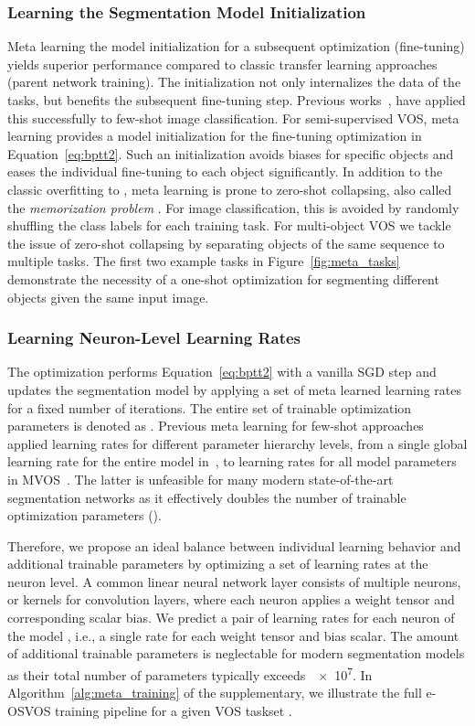 \documentclass{article}
\begin{document}
    \subsubsection{Learning the Segmentation Model Initialization}
Meta learning the model initialization for a subsequent optimization (fine-tuning) yields superior performance compared to classic transfer learning approaches (parent network training).
The initialization not only internalizes the data of the tasks, but benefits the subsequent fine-tuning step.
Previous works~\cite{MAML,Meta-SGD,MVOS}, have applied this successfully to few-shot image classification.
For semi-supervised VOS, meta learning provides a model initialization  for the fine-tuning optimization in Equation~\eqref{eq:bptt2}.
Such an initialization avoids biases for specific objects and eases the individual fine-tuning to each object significantly.
In addition to the classic overfitting to , meta learning is prone to zero-shot collapsing, also called the \textit{memorization problem} \cite{memorization}.
For image classification, this is avoided by randomly shuffling the class labels for each training task.
For multi-object VOS we tackle the issue of zero-shot collapsing by separating objects of the same sequence to multiple tasks.
The first two example tasks in Figure~\ref{fig:meta_tasks} demonstrate the necessity of a one-shot optimization for segmenting different objects given the same input image.

    \subsubsection{Learning Neuron-Level Learning Rates}
The optimization  performs Equation~\eqref{eq:bptt2} with a vanilla SGD step and updates the segmentation model by applying a set of meta learned learning rates  for a fixed number of iterations.
The entire set of trainable optimization parameters is denoted as . Previous meta learning for few-shot approaches applied learning rates for different parameter hierarchy levels, from a single global learning rate for the entire model in~\cite{Meta-SGD}, to learning rates for all model parameters  in MVOS~\cite{MVOS}.
The latter is unfeasible for many modern state-of-the-art segmentation networks as it effectively doubles the number of trainable optimization parameters ().


        Therefore, we propose an ideal balance between individual learning behavior and additional trainable parameters by optimizing a set of learning rates at the neuron level.
A common linear neural network layer consists of multiple neurons, or kernels for convolution layers, where each neuron applies a weight tensor and corresponding scalar bias.
We predict a pair of learning rates for each neuron of the model , i.e., a single rate for each weight tensor and bias scalar.
The amount of additional trainable parameters is neglectable for modern segmentation models as their total number of parameters typically exceeds~\num{e7}.
In Algorithm~\ref*{alg:meta_training} of the supplementary, we illustrate the full e-OSVOS training pipeline for a given VOS taskset .
\end{document}
